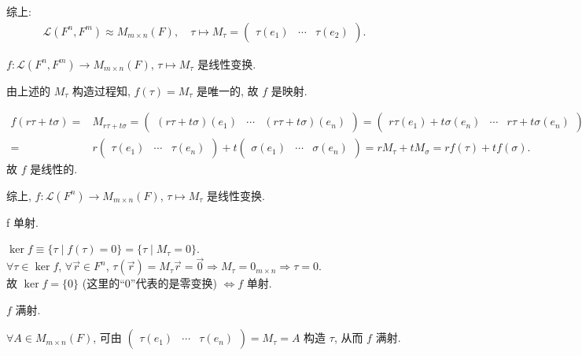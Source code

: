 \documentclass{note}
\begin{document}
综上:
\begin{align*}
    \boxed{\mathcal{L}(F^n,F^m)\approx M_{m\times n}(F),\quad\tau\mapsto M_{\tau}=\begin{pmatrix}
        \tau(e_1)&\cdots&\tau(e_2)
    \end{pmatrix}}.
\end{align*}

$f:\mathcal{L}(F^n,F^m)\rightarrow M_{m\times n}(F)$, $\tau\mapsto M_{\tau}$ 是线性变换.
\begin{pf}
    由上述的 $M_{\tau}$ 构造过程知, $f(\tau)=M_{\tau}$ 是唯一的, 故 $f$ 是映射.

    \begin{align*}
        f(r\tau+t\sigma)=&M_{r\tau+t\sigma}=\begin{pmatrix}
            (r\tau+t\sigma)(e_1)&\cdots&(r\tau+t\sigma)(e_n)
        \end{pmatrix}=\begin{pmatrix}
            r\tau(e_1)+t\sigma(e_n)&\cdots&r\tau+t\sigma(e_n)
        \end{pmatrix}\\
        =&r\begin{pmatrix}
            \tau(e_1)&\cdots&\tau(e_n)
        \end{pmatrix}+t\begin{pmatrix}
            \sigma(e_1)&\cdots&\sigma(e_n)
        \end{pmatrix}=rM_{\tau}+tM_{\sigma}=rf(\tau)+tf(\sigma).
    \end{align*}
    故 $f$ 是线性的.

    综上, $f:\mathcal{L}(F^n)\rightarrow M_{m\times n}(F)$, $\tau\mapsto M_{\tau}$ 是线性变换.
\end{pf}

f 单射.
\begin{pf}
    $\ker f\equiv\{\tau\mid f(\tau)=0\}=\{\tau\mid M_{\tau}=0\}$.\\
    $\forall\tau\in\ker f$, $\forall\vec{r}\in F^n$, $\tau(\vec{r})=M_{\tau}\vec{r}=\vec{0}\Longrightarrow M_{\tau}=0_{m\times n}\Longrightarrow\tau=0$.\\
    故 $\ker f=\{0\}$ (这里的``$0$''代表的是零变换) $\Longleftrightarrow f$ 单射.
\end{pf}

$f$ 满射.
\begin{pf}
    $\forall A\in M_{m\times n}(F)$, 可由 $\begin{pmatrix}
        \tau(e_1)&\cdots&\tau(e_n)
    \end{pmatrix}=M_{\tau}=A$ 构造 $\tau$, 从而 $f$ 满射.
\end{pf}
\end{document}
